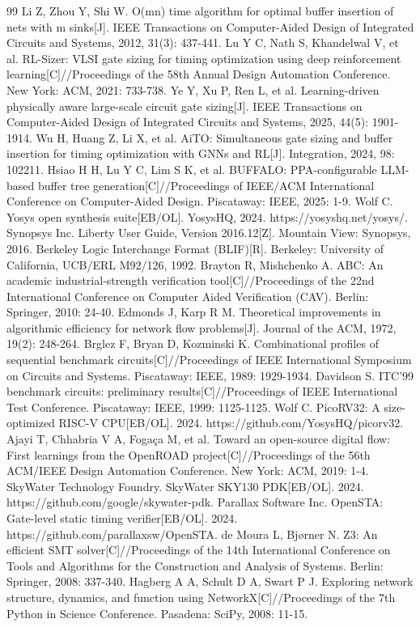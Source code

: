 \documentclass[twocolumn,10pt]{ctexart}
\begin{document}
\begin{thebibliography}{99}
 Li Z, Zhou Y, Shi W. O(mn) time algorithm for optimal buffer insertion of nets with m sinks[J]. IEEE Transactions on Computer-Aided Design of Integrated Circuits and Systems, 2012, 31(3): 437-441.
 Lu Y C, Nath S, Khandelwal V, et al. RL-Sizer: VLSI gate sizing for timing optimization using deep reinforcement learning[C]//Proceedings of the 58th Annual Design Automation Conference. New York: ACM, 2021: 733-738.
 Ye Y, Xu P, Ren L, et al. Learning-driven physically aware large-scale circuit gate sizing[J]. IEEE Transactions on Computer-Aided Design of Integrated Circuits and Systems, 2025, 44(5): 1901-1914.
 Wu H, Huang Z, Li X, et al. AiTO: Simultaneous gate sizing and buffer insertion for timing optimization with GNNs and RL[J]. Integration, 2024, 98: 102211.
 Hsiao H H, Lu Y C, Lim S K, et al. BUFFALO: PPA-configurable LLM-based buffer tree generation[C]//Proceedings of IEEE/ACM International Conference on Computer-Aided Design. Piscataway: IEEE, 2025: 1-9.
 Wolf C. Yosys open synthesis suite[EB/OL]. YosysHQ, 2024. https://yosyshq.net/yosys/.
 Synopsys Inc. Liberty User Guide, Version 2016.12[Z]. Mountain View: Synopsys, 2016.
 Berkeley Logic Interchange Format (BLIF)[R]. Berkeley: University of California, UCB/ERL M92/126, 1992.
 Brayton R, Mishchenko A. ABC: An academic industrial-strength verification tool[C]//Proceedings of the 22nd International Conference on Computer Aided Verification (CAV). Berlin: Springer, 2010: 24-40.
 Edmonds J, Karp R M. Theoretical improvements in algorithmic efficiency for network flow problems[J]. Journal of the ACM, 1972, 19(2): 248-264.
 Brglez F, Bryan D, Kozminski K. Combinational profiles of sequential benchmark circuits[C]//Proceedings of IEEE International Symposium on Circuits and Systems. Piscataway: IEEE, 1989: 1929-1934.
 Davidson S. ITC'99 benchmark circuits: preliminary results[C]//Proceedings of IEEE International Test Conference. Piscataway: IEEE, 1999: 1125-1125.
 Wolf C. PicoRV32: A size-optimized RISC-V CPU[EB/OL]. 2024. https://github.com/YosysHQ/picorv32.
 Ajayi T, Chhabria V A, Fogaça M, et al. Toward an open-source digital flow: First learnings from the OpenROAD project[C]//Proceedings of the 56th ACM/IEEE Design Automation Conference. New York: ACM, 2019: 1-4.
 SkyWater Technology Foundry. SkyWater SKY130 PDK[EB/OL]. 2024. https://github.com/google/skywater-pdk.
 Parallax Software Inc. OpenSTA: Gate-level static timing verifier[EB/OL]. 2024. https://github.com/parallaxsw/OpenSTA.
 de Moura L, Bjørner N. Z3: An efficient SMT solver[C]//Proceedings of the 14th International Conference on Tools and Algorithms for the Construction and Analysis of Systems. Berlin: Springer, 2008: 337-340.
 Hagberg A A, Schult D A, Swart P J. Exploring network structure, dynamics, and function using NetworkX[C]//Proceedings of the 7th Python in Science Conference. Pasadena: SciPy, 2008: 11-15.
\end{thebibliography}
\end{document}
